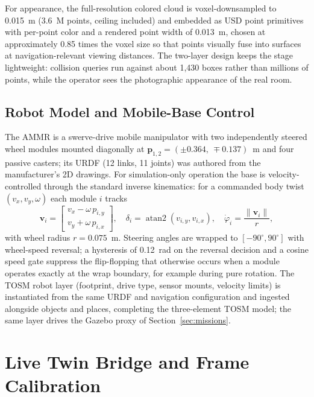 For appearance, the full-resolution colored cloud is voxel-downsampled to
0.015~m (3.6~M points, ceiling included) and embedded as USD point primitives
with per-point color and a rendered point width of 0.013~m, chosen at
approximately 0.85 times the voxel size so that points visually fuse into
surfaces at navigation-relevant viewing distances. The two-layer design keeps
the stage lightweight: collision queries run against about 1{,}430 boxes rather
than millions of points, while the operator sees the photographic appearance of
the real room.

\subsection{Robot Model and Mobile-Base Control}
\label{subsec:s2s-robot}

The AMMR is a swerve-drive mobile manipulator with two independently steered
wheel modules mounted diagonally at $\mathbf{p}_{1,2}=(\pm0.364,\ \mp0.137)$~m
and four passive casters; its URDF (12 links, 11 joints) was authored from the
manufacturer's 2D drawings. For simulation-only operation the base is
velocity-controlled through the standard inverse kinematics: for a commanded
body twist $(v_x, v_y, \omega)$ each module $i$ tracks
\begin{equation}
\mathbf{v}_i = \begin{bmatrix} v_x - \omega\, p_{i,y} \\
v_y + \omega\, p_{i,x} \end{bmatrix},\quad
\delta_i = \operatorname{atan2}(v_{i,y}, v_{i,x}),\quad
\dot\varphi_i = \frac{\lVert \mathbf{v}_i \rVert}{r},
\label{eq:swerve}
\end{equation}
with wheel radius $r=0.075$~m. Steering angles are wrapped to
$[-90^\circ, 90^\circ]$ with wheel-speed reversal; a hysteresis of 0.12~rad on
the reversal decision and a cosine speed gate suppress the flip-flopping that
otherwise occurs when a module operates exactly at the wrap boundary, for
example during pure rotation. The TOSM robot layer (footprint, drive type,
sensor mounts, velocity limits) is instantiated from the same URDF and
navigation configuration and ingested alongside objects and places, completing
the three-element TOSM model; the same layer drives the Gazebo proxy of
Section~\ref{sec:missions}.

\section{Live Twin Bridge and Frame Calibration}
\label{sec:twin-bridge}

